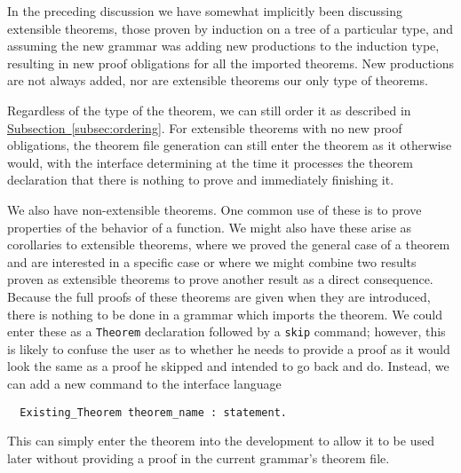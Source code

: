 \documentclass[11pt]{article}
\newcommand{\subsec}[1]{\hyperref[subsec:#1]{Subsection~\ref*{subsec:#1}}}
\begin{document}
In the preceding discussion we have somewhat implicitly been
discussing extensible theorems, those proven by induction on a tree of
a particular type, and assuming the new grammar was adding new
productions to the induction type, resulting in new proof obligations
for all the imported theorems.  New productions are not always added,
nor are extensible theorems our only type of theorems.

Regardless of the type of the theorem, we can still order it as
described in \subsec{ordering}.  For extensible theorems with no new
proof obligations, the theorem file generation can still enter the
theorem as it otherwise would, with the interface determining at the
time it processes the theorem declaration that there is nothing to
prove and immediately finishing it.


We also have non-extensible theorems.  One common use of these is to
prove properties of the behavior of a function.  We might also have
these arise as corollaries to extensible theorems, where we proved the
general case of a theorem and are interested in a specific case or
where we might combine two results proven as extensible theorems to
prove another result as a direct consequence.
%
Because the full proofs of these theorems are given when they are
introduced, there is nothing to be done in a grammar which imports the
theorem.  We could enter these as a \lstinline{Theorem} declaration
followed by a \lstinline{skip} command; however, this is likely to
confuse the user as to whether he needs to provide a proof as it would
look the same as a proof he skipped and intended to go back and do.
Instead, we can add a new command to the interface language
\begin{lstlisting}
  Existing_Theorem theorem_name : statement.
\end{lstlisting}
This can simply enter the theorem into the development to allow it to
be used later without providing a proof in the current grammar's
theorem file.
\end{document}
